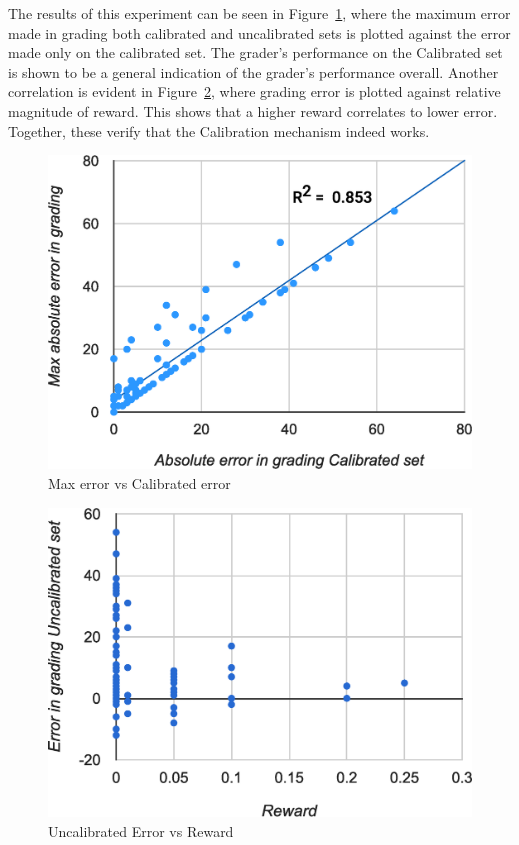 \documentclass{sigchi}
\begin{document}
The results of this experiment can be seen in Figure~\ref{fig:error-calibration}, where the maximum error made in grading both calibrated and uncalibrated sets is plotted against the error made only on the calibrated set. The grader's performance on the Calibrated set is shown to be a general indication of the grader's performance overall. Another correlation is evident in Figure~\ref{fig:reward-error}, where grading error is plotted against relative magnitude of reward. This shows that a higher reward correlates to lower error. Together, these verify that the Calibration mechanism indeed works.

\begin{figure}[!h]
\centering
\includegraphics[width=0.9\columnwidth]{Error-Calibration-Graph.eps}
\caption{Max error vs Calibrated error}
\label{fig:error-calibration}
\end{figure}

\begin{figure}[!h]
\centering
\includegraphics[width=0.9\columnwidth]{Reward-Error-Graph.eps}
\caption{Uncalibrated Error vs Reward}
\label{fig:reward-error}
\end{figure}
\end{document}
